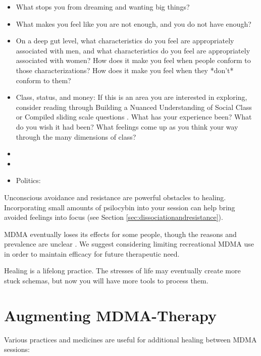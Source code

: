 \documentclass[12pt,letterpaper]{article}
\begin{document}
\begin{itemize}
    \item What stops you from dreaming and wanting big things?
    \item What makes you feel like you are not enough, and you do not have enough?
    \item On a deep gut level, what characteristics do you feel are appropriately associated with men, and what characteristics do you feel are appropriately associated with women? How does it make you feel when people conform to those characterizations? How does it make you feel when they *don't* conform to them?
    \item Class, status, and money: If this is an area you are interested in exploring, consider reading through Building a Nuanced Understanding of Social Class or Compiled sliding scale questions . What has your experience been? What do you wish it had been? What feelings come up as you think your way through the many dimensions of class?
    \item {}
    \item {}
    \item Politics: 
\end{itemize}
Unconscious avoidance and resistance are powerful obstacles to healing. Incorporating small amounts of psilocybin into your session can help bring avoided feelings into focus (see Section \ref{sec:dissociationandresistance}).

MDMA eventually loses its effects for some people, though the reasons and prevalence are unclear \cite{parrottTolerance}. We suggest considering limiting recreational MDMA use in order to maintain efficacy for future therapeutic need.

Healing is a lifelong practice. The stresses of life may eventually create more stuck schemas, but now you will have more tools to process them.
\section{Augmenting MDMA-Therapy}
\label{healingPractices}
Various practices and medicines are useful for additional healing between MDMA sessions:
\end{document}
